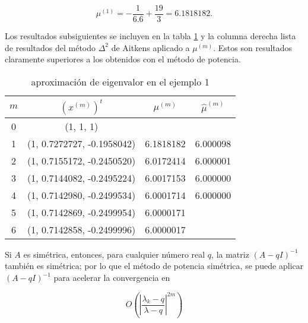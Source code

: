 \documentclass{report}
\numberwithin{subsection}{section} %
\begin{document}
$$\mu^{(1)} = -\frac{1}{6.6} + \frac{19}{3} = 6.1818182.$$

Los resultados subsiguientes se incluyen en la tabla \ref{tab:ej222} y la columna derecha lista de resultados del método $\Delta^2$ de Aitkens aplicado a $\mu^{(m)}$. Estos son resultados claramente superiores a los obtenidos con el método de potencia.

\begin{table}[h!]
    \centering
    \caption{aproximación de eigenvalor en el ejemplo 1}
    \label{tab:ej222}
    \begin{tabular}{|cccc|} \hline
        $m$ & $(x^{(m)})^t$ & $\mu^{(m)}$ & $\hat{\mu}^{(m)}$ \\ \hline
        0  &  (1, 1, 1)  & & \\
        1  &  (1, 0.7272727, -0.1958042)  &  6.1818182 & 6.000098 \\
        2  &  (1, 0.7155172, -0.2450520)  &  6.0172414 & 6.000001 \\
        3  &  (1, 0.7144082, -0.2495224)  &  6.0017153 & 6.000000 \\
        4  &  (1, 0.7142980, -0.2499534)  &  6.0001714 & 6.000000 \\
        5  &  (1, 0.7142869, -0.2499954)  &  6.0000171 & \\
        6  &  (1, 0.7142858, -0.2499996)  &  6.0000017 & \\ \hline
    \end{tabular}
\end{table}

Si $A$ es simétrica, entonces, para cualquier número real $q$, la matriz $(A-q I)^{-1}$ también es simétrica; por lo que el método de potencia simétrica, se puede aplicar $(A-q I)^{-1}$ para acelerar la convergencia en

$$O\left( \left|\frac{\lambda_k - q}{\lambda - q}\right|^{2m} \right)$$
\end{document}
